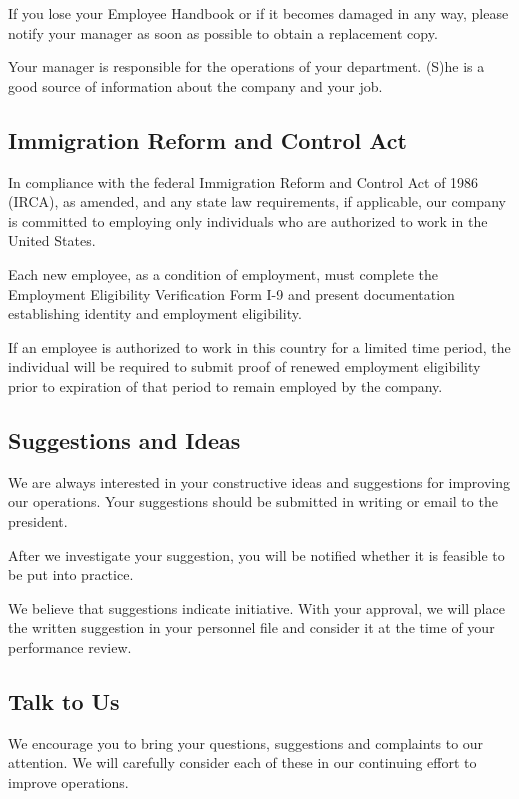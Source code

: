 \documentclass{book}
\begin{document}
If you lose your Employee Handbook or if it becomes damaged in any way, please notify your manager as soon as possible to obtain a replacement copy.

Your manager is responsible for the operations of your department. (S)he is a good source of information about the company and your job.

\subsection{Immigration Reform and Control Act}

In compliance with the federal Immigration Reform and Control Act of 1986 (IRCA), as amended, and any state law requirements, if applicable, our company is committed to employing only individuals who are authorized to work in the United States.

Each new employee, as a condition of employment, must complete the Employment Eligibility Verification Form I-9 and present documentation establishing identity and employment eligibility. 

If an employee is authorized to work in this country for a limited time period, the individual will be required to submit proof of renewed employment eligibility prior to expiration of that period to remain employed by the company.

\subsection{Suggestions and Ideas}

We are always interested in your constructive ideas and suggestions for improving our operations. Your suggestions should be submitted in writing or email to the president.

After we investigate your suggestion, you will be notified whether it is feasible to be put into practice.

We believe that suggestions indicate initiative. With your approval, we will place the written suggestion in your personnel file and consider it at the time of your performance review.

\subsection{Talk to Us}

We encourage you to bring your questions, suggestions and complaints to our attention. We will carefully consider each of these in our continuing effort to improve operations.
\end{document}
